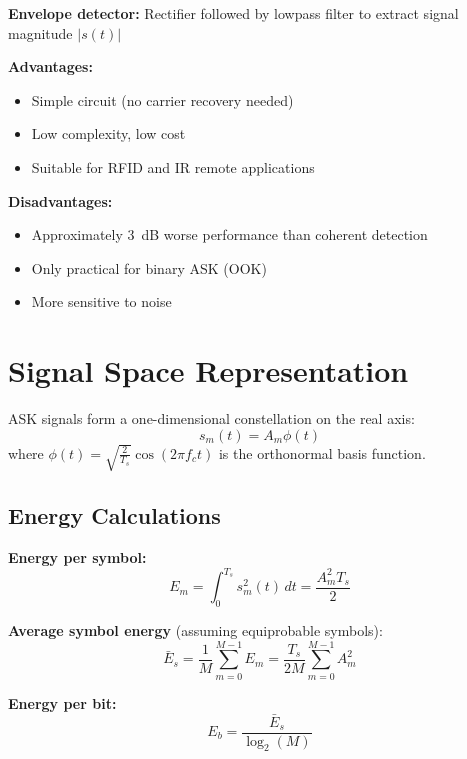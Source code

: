 \textbf{Envelope detector:} Rectifier followed by lowpass filter to extract signal magnitude $|s(t)|$

\textbf{Advantages:}
\begin{itemize}
\item[\checkmark] Simple circuit (no carrier recovery needed)
\item[\checkmark] Low complexity, low cost
\item[\checkmark] Suitable for RFID and IR remote applications
\end{itemize}

\textbf{Disadvantages:}
\begin{itemize}
\item[\texttimes] Approximately 3~dB worse performance than coherent detection
\item[\texttimes] Only practical for binary ASK (OOK)
\item[\texttimes] More sensitive to noise
\end{itemize}

\section{Signal Space Representation}

ASK signals form a one-dimensional constellation on the real axis:
\begin{equation}
s_m(t) = A_m \phi(t)
\end{equation}
where $\phi(t) = \sqrt{\frac{2}{T_s}} \cos(2\pi f_c t)$ is the orthonormal basis function.

\subsection{Energy Calculations}

\textbf{Energy per symbol:}
\begin{equation}
E_m = \int_0^{T_s} s_m^2(t) \, dt = \frac{A_m^2 T_s}{2}
\end{equation}

\textbf{Average symbol energy} (assuming equiprobable symbols):
\begin{equation}
\bar{E}_s = \frac{1}{M} \sum_{m=0}^{M-1} E_m = \frac{T_s}{2M} \sum_{m=0}^{M-1} A_m^2
\end{equation}

\textbf{Energy per bit:}
\begin{equation}
E_b = \frac{\bar{E}_s}{\log_2(M)}
\end{equation}

